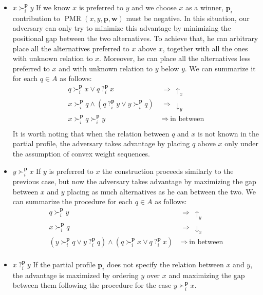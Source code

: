 \documentclass[12pt]{article}
\newcommand{\pprofile}{\textbf{p}}%
\newcommand{\w}{\textbf{w}}%
\DeclareMathOperator{\PMR}{PMR}
\begin{document}
\begin{itemize}
	\item $x \succ_i^\pprofile y$
	\newline If we know $x$ is preferred to $y$ and we choose $x$ as a winner, $\pprofile_i$ contribution to $\PMR(x,y,\pprofile,\w)$ must be negative. In this situation, our adversary can only try to minimize this advantage by minimizing the positional gap between the two alternatives. To achieve that, he can arbitrary place all the alternatives preferred to $x$ above $x$, together with all the ones with unknown relation to $x$. Moreover, he can place all the alternatives less preferred to $x$ and with unknown relation to $y$ below $y$. We can summarize it for each $q \in A$ as follows:
	\begin{align*}
	q \succ_i^\pprofile x \vee q \ ?_i^\pprofile \ x \ & \Rightarrow \ \uparrow_x \\
	x \succ_i^\pprofile q \wedge ( q \ ?_i^\pprofile \ y \vee y \succ_i^\pprofile q) \ & \Rightarrow \ \downarrow_y \\
	x \succ_i^\pprofile q \succ_i^\pprofile y \ & \Rightarrow \ \text{in between} \\
	\end{align*}
	It is worth noting that when the relation between $q$ and $x$ is not known in the partial profile, the adversary takes advantage by placing $q$ above $x$ only under the assumption of convex weight sequences.
	\item $y \succ_i^\pprofile x$
	\newline If $y$ is preferred to $x$ the construction proceeds similarly to the previous case, but now the adversary takes advantage by maximizing the gap between $x$ and $y$ placing as much alternatives as he can between the two. We can summarize the procedure for each $q \in A$ as follows:
	\begin{align*}
	q \succ_i^\pprofile y \ & \Rightarrow \ \uparrow_y \\
	x \succ_i^\pprofile q \ & \Rightarrow \ \downarrow_x \\
	(y \succ_i^\pprofile q \vee y \ ?_i^\pprofile \ q) \wedge (q \succ_i^\pprofile x \vee q \ ?_i^\pprofile \ x) \ & \Rightarrow \ \text{in between} \\
	\end{align*}
	\item $x \ ?_i^\pprofile \ y$
	\newline If the partial profile $\pprofile_i$ does not specify the relation between $x$ and $y$, the advantage is maximized by ordering $y$ over $x$ and maximizing the gap between them following the procedure for the case $y \succ_i^\pprofile x$.
\end{itemize}
\end{document}
